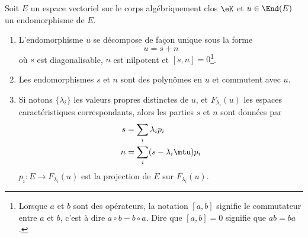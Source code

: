 \begin{theorem} \label{ThoRURcpW}
    Soit \( E\) un espace vectoriel sur le corps algébriquement clos \( \eK\) et \( u\in\End(E)\) un endomorphisme de \( E\).

    \begin{enumerate}
        \item

            L'endomorphisme \( u\) se décompose de façon unique sous la forme
            \begin{equation}
                u=s+n
            \end{equation}
            où \( s\) est diagonalisable, \( n\) est nilpotent et \( [s,n]=0\)\footnote{Lorsque \( a\) et \( b\) sont des opérateurs, la notation \( [a,b]\) signifie le commutateur entre \( a\) et \( b\), c'est à dire \( a\circ b-b\circ a\). Dire que \( [a,b]=0\) signifie que \( ab=ba\).}.
        \item
            Les endomorphismes \( s\) et \( n\) sont des polynômes en \( u\) et commutent avec \( u\).
        \item   \label{ItemThoRURcpWiii}
            Si notons \( \{ \lambda_i \}\) les valeurs propres distinctes de \( u\), et \( F_{\lambda_i}(u)\) les espaces caractéristiques correspondants, alors les parties \( s\) et \( n\) sont données par
            \begin{subequations}
                \begin{align}
                    s&=\sum_i\lambda_ip_i\\
                    n&=\sum_i(s-\lambda_i\mtu)p_i
                \end{align}
            \end{subequations}
            \( p_i\colon E\to F_{\lambda_i}(u)\) est la projection de \( E\) sur \( F_{\lambda_i}(u)\).
    \end{enumerate}
\end{theorem}

